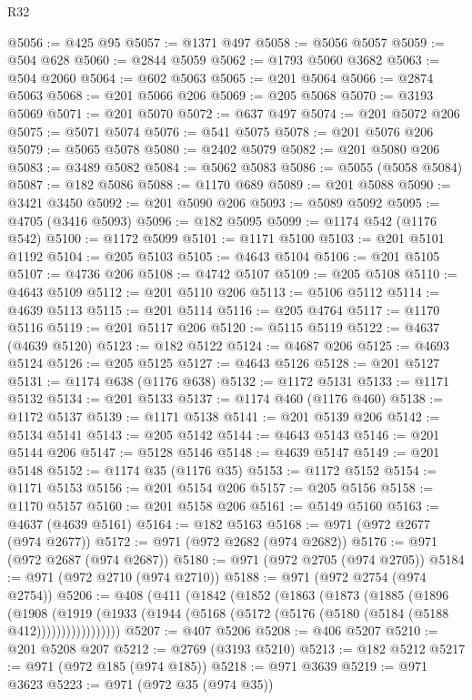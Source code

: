 \begin{lexlean}{R32}
\begin{coremodule}
@5056 := @425 @95
@5057 := @1371 @497
@5058 := @5056 @5057
@5059 := @504 @628
@5060 := @2844 @5059
@5062 := @1793 @5060 @3682
@5063 := @504 @2060
@5064 := @602 @5063
@5065 := @201 @5064
@5066 := @2874 @5063
@5068 := @201 @5066 @206
@5069 := @205 @5068
@5070 := @3193 @5069
@5071 := @201 @5070
@5072 := @637 @497
@5074 := @201 @5072 @206
@5075 := @5071 @5074
@5076 := @541 @5075
@5078 := @201 @5076 @206
@5079 := @5065 @5078
@5080 := @2402 @5079
@5082 := @201 @5080 @206
@5083 := @3489 @5082
@5084 := @5062 @5083
@5086 := @5055 (@5058 @5084)
@5087 := @182 @5086
@5088 := @1170 @689
@5089 := @201 @5088
@5090 := @3421 @3450
@5092 := @201 @5090 @206
@5093 := @5089 @5092
@5095 := @4705 (@3416 @5093)
@5096 := @182 @5095
@5099 := @1174 @542 (@1176 @542)
@5100 := @1172 @5099
@5101 := @1171 @5100
@5103 := @201 @5101 @1192
@5104 := @205 @5103
@5105 := @4643 @5104
@5106 := @201 @5105
@5107 := @4736 @206
@5108 := @4742 @5107
@5109 := @205 @5108
@5110 := @4643 @5109
@5112 := @201 @5110 @206
@5113 := @5106 @5112
@5114 := @4639 @5113
@5115 := @201 @5114
@5116 := @205 @4764
@5117 := @1170 @5116
@5119 := @201 @5117 @206
@5120 := @5115 @5119
@5122 := @4637 (@4639 @5120)
@5123 := @182 @5122
@5124 := @4687 @206
@5125 := @4693 @5124
@5126 := @205 @5125
@5127 := @4643 @5126
@5128 := @201 @5127
@5131 := @1174 @638 (@1176 @638)
@5132 := @1172 @5131
@5133 := @1171 @5132
@5134 := @201 @5133
@5137 := @1174 @460 (@1176 @460)
@5138 := @1172 @5137
@5139 := @1171 @5138
@5141 := @201 @5139 @206
@5142 := @5134 @5141
@5143 := @205 @5142
@5144 := @4643 @5143
@5146 := @201 @5144 @206
@5147 := @5128 @5146
@5148 := @4639 @5147
@5149 := @201 @5148
@5152 := @1174 @35 (@1176 @35)
@5153 := @1172 @5152
@5154 := @1171 @5153
@5156 := @201 @5154 @206
@5157 := @205 @5156
@5158 := @1170 @5157
@5160 := @201 @5158 @206
@5161 := @5149 @5160
@5163 := @4637 (@4639 @5161)
@5164 := @182 @5163
@5168 := @971 (@972 @2677 (@974 @2677))
@5172 := @971 (@972 @2682 (@974 @2682))
@5176 := @971 (@972 @2687 (@974 @2687))
@5180 := @971 (@972 @2705 (@974 @2705))
@5184 := @971 (@972 @2710 (@974 @2710))
@5188 := @971 (@972 @2754 (@974 @2754))
@5206 := @408
    (@411
      (@1842
        (@1852
          (@1863
            (@1873
              (@1885
                (@1896
                  (@1908
                    (@1919
                      (@1933 (@1944 (@5168 (@5172 (@5176 (@5180 (@5184 (@5188 @412)))))))))))))))))
@5207 := @407 @5206
@5208 := @406 @5207
@5210 := @201 @5208 @207
@5212 := @2769 (@3193 @5210)
@5213 := @182 @5212
@5217 := @971 (@972 @185 (@974 @185))
@5218 := @971 @3639
@5219 := @971 @3623
@5223 := @971 (@972 @35 (@974 @35))

\end{coremodule}
\end{lexlean}
